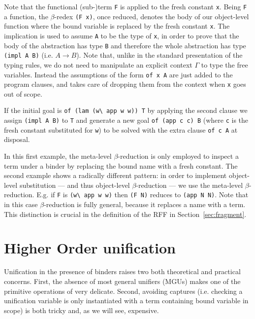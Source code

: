 \documentclass{llncs}
\begin{document}
Note that the functional (sub-)term
\verb+F+ is applied to the fresh constant \verb+x+.  Being \verb+F+ a
function, the $\beta$-redex \verb+(F x)+, once reduced, denotes the body of
our object-level function where the bound variable is replaced by the fresh
constant \verb+x+.
The implication is used to
assume \verb+A+ to be the type of \verb+x+, in order to prove that the body of
the abstraction has type \verb+B+ and therefore the whole abstraction has type
\verb+(impl A B)+ (i.e. $A \to B$). Note that, unlike in
the standard presentation of the typing rules, we do not need to manipulate an
explicit context $\Gamma$ to type the free variables. Instead the assumptions
of the form \verb+of x A+ are just added to the program clauses, and \lp{}
takes care of dropping them from the context when \verb+x+ goes out of scope.

If the initial goal is
\verb+of (lam (w\ app w w)) T+ by applying the second clause we assign
\verb+(impl A B)+ to \verb+T+ and generate
a new goal \verb+of (app c c) B+ (where \verb+c+ is the fresh constant
substituted for \verb+w+) to be solved with the extra clause \verb+of c A+
at disposal.

In this first example, the meta-level $\beta$-reduction is only employed
to inspect a term under a binder by replacing the bound name with a fresh
constant.  The second example
shows a radically different pattern: in order to implement object-level
substitution --- and thus object-level $\beta$-reduction --- we use the
meta-level $\beta$-reduction. E.g. if \verb+F+ is \verb+(w\ app w w)+
then \verb+(F N)+ reduces to \verb+(app N N)+.  Note that in this case
$\beta$-reduction is fully general, because it replaces a name with a term.
This distinction is crucial in the definition of the RFF in
Section~\ref{sec:fragment}.

\section{Higher Order unification}%
\label{sec:ho}

Unification in the presence of binders raises two both theoretical and
practical concerns. First, the absence of most general unifiers (MGUs) makes
one of the primitive operations of \lp{} very delicate.  Second, avoiding
captures (i.e. checking a unification variable is only instantiated with a
term containing bound variable in scope) is both tricky and, as we will see,
expensive.
\end{document}
